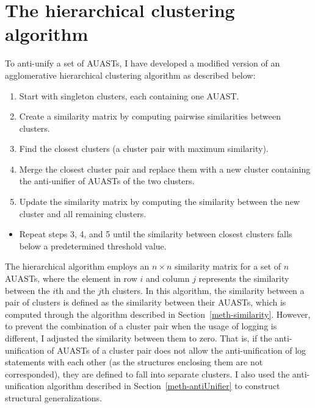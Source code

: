 


\section{The hierarchical clustering algorithm} \label{clustering-alg}
To anti-unify a set of AUASTs, I have developed a modified version of an agglomerative hierarchical clustering algorithm as described below:

\begin{enumerate} [leftmargin=.5in]
\item Start with singleton clusters, each containing one AUAST.
\item Create a similarity matrix by computing pairwise similarities between clusters.
\item Find the closest clusters (a cluster pair with maximum similarity).
\item Merge the closest cluster pair and replace them with a new cluster containing the anti-unifier of AUASTs of the two clusters.
\item Update the similarity matrix by computing the similarity between the new cluster and all remaining clusters.
\end{enumerate}
\begin{itemize} [leftmargin=.5in]
\item Repeat steps 3, 4, and 5 until the similarity between closest clusters falls below a predetermined threshold value.
\end{itemize}


The hierarchical algorithm employs an $n \times n$ similarity matrix for a set of $n$ AUASTs, where the element in row $i$ and column $j$ represents the similarity between the $i$th and the $j$th clusters. In this algorithm, the similarity between a pair of clusters is defined as the similarity between their AUASTs, which is computed through the algorithm described in Section~\ref{meth-similarity}. However, to prevent the combination of a cluster pair when the usage of logging is different, I adjusted the similarity between them to zero. That is, if the anti-unification of AUASTs of a cluster pair does not allow the anti-unification of log statements with each other (as the structures enclosing them are not corresponded), they are defined to fall into separate clusters. I also used the anti-unification algorithm described in Section~\ref{meth-antiUnifier} to construct structural generalizations.

